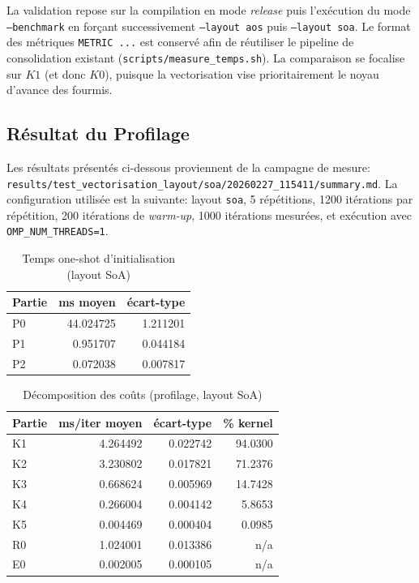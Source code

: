 La validation repose sur la compilation en mode \emph{release} puis l'exécution du mode \texttt{--benchmark} en
forçant successivement \texttt{--layout aos} puis \texttt{--layout soa}. Le format des métriques
\texttt{METRIC ...} est conservé afin de réutiliser le pipeline de consolidation existant
(\texttt{scripts/measure\_temps.sh}). La comparaison se focalise sur $K1$ (et donc $K0$), puisque la vectorisation
vise prioritairement le noyau d'avance des fourmis.

\subsection{Résultat du Profilage}

\noindent
Les résultats présentés ci-dessous proviennent de la campagne de mesure:\\
\texttt{results/test\_vectorisation\_layout/soa/20260227\_115411/summary.md}. La configuration utilisée
est la suivante: layout \texttt{soa}, 5 répétitions, 1200 itérations par répétition, 200 itérations de
\textit{warm-up}, 1000 itérations mesurées, et exécution avec \texttt{OMP\_NUM\_THREADS=1}.

\begin{table}[H]
\centering
\caption{Temps one-shot d'initialisation (layout SoA)}
\label{tab:vec-soa-init}
\begin{tabular}{@{}lrr@{}}
\toprule
\textbf{Partie} & \textbf{ms moyen} & \textbf{écart-type} \\
\midrule
P0 & 44.024725 & 1.211201 \\
P1 & 0.951707 & 0.044184 \\
P2 & 0.072038 & 0.007817 \\
\bottomrule
\end{tabular}
\end{table}

\begin{table}[H]
\centering
\caption{Décomposition des coûts (profilage, layout SoA)}
\label{tab:vec-soa-decomp}
\begin{tabular}{@{}lrrr@{}}
\toprule
\textbf{Partie} & \textbf{ms/iter moyen} & \textbf{écart-type} & \textbf{\% kernel} \\
\midrule
K1 & 4.264492 & 0.022742 & 94.0300 \\
K2 & 3.230802 & 0.017821 & 71.2376 \\
K3 & 0.668624 & 0.005969 & 14.7428 \\
K4 & 0.266004 & 0.004142 & 5.8653 \\
K5 & 0.004469 & 0.000404 & 0.0985 \\
R0 & 1.024001 & 0.013386 & n/a \\
E0 & 0.002005 & 0.000105 & n/a \\
\bottomrule
\end{tabular}
\end{table}

